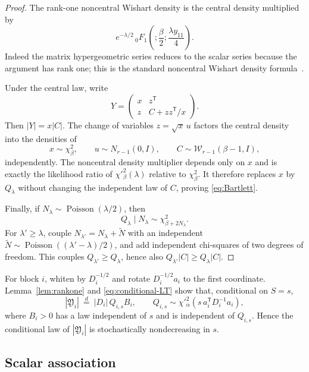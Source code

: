 \documentclass[11pt]{article}
\begin{document}
\begin{proof}
The rank-one noncentral Wishart density is the central density multiplied by
\[
 e^{-\lambda/2}\,
 {}_0F_1\!\left(;\frac{\beta}{2};\frac{\lambda y_{11}}{4}\right).
\]
Indeed the matrix hypergeometric series reduces to the scalar series because
the argument has rank one; this is the standard noncentral Wishart density
formula~\cite{Muirhead}.

Under the central law, write
\[
 Y=\begin{pmatrix}x&z^\mathsf T\\z&C+zz^\mathsf T/x\end{pmatrix}.
\]
Then \(|Y|=x|C|\).  The change of variables \(z=\sqrt{x}\,u\) factors the
central density into the densities of
\[
 x\sim\chi^2_\beta,\qquad
 u\sim N_{r-1}(0,I),\qquad
 C\sim\mathcal W_{r-1}(\beta-1,I),
\]
independently.  The noncentral density multiplier depends only on \(x\) and
is exactly the likelihood ratio of \(\chi'^2_\beta(\lambda)\) relative to
\(\chi^2_\beta\).  It therefore replaces \(x\) by \(Q_\lambda\) without
changing the independent law of \(C\), proving \eqref{eq:Bartlett}.

Finally, if \(N_\lambda\sim\operatorname{Poisson}(\lambda/2)\), then
\[
 Q_\lambda\mid N_\lambda\sim\chi^2_{\beta+2N_\lambda}.
\]
For \(\lambda'\geq\lambda\), couple
\(N_{\lambda'}=N_\lambda+\widetilde N\) with an independent
\(\widetilde N\sim\operatorname{Poisson}((\lambda'-\lambda)/2)\), and add
independent chi-squares of two degrees of freedom.  This couples
\(Q_{\lambda'}\geq Q_\lambda\), hence also
\(Q_{\lambda'}|C|\geq Q_\lambda|C|\).
\end{proof}

For block \(i\), whiten by \(D_i^{-1/2}\) and rotate
\(D_i^{-1/2}a_i\) to the first coordinate.  Lemma~\ref{lem:rankone} and
\eqref{eq:conditional-LT} show that, conditional on \(S=s\),
\begin{equation}\label{eq:blockfactor}
 |\mathfrak Y_i|
 \ \stackrel d=\
 |D_i|\,Q_{i,s}B_i,\qquad
 Q_{i,s}\sim
 \chi'^2_\alpha\!\left(s\,a_i^\mathsf T D_i^{-1}a_i\right),
\end{equation}
where \(B_i>0\) has a law independent of \(s\) and is independent of
\(Q_{i,s}\).  Hence the conditional law of \(|\mathfrak Y_i|\) is
stochastically nondecreasing in \(s\).

\subsection{Scalar association}
\end{document}

